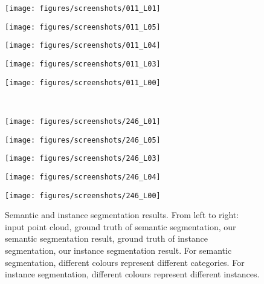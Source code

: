 \documentclass[10pt,twocolumn,letterpaper]{article}
\begin{document}
\begin{figure*}[t!]
  \begin{minipage}{0.2\linewidth}
    \texttt{[image: figures/screenshots/011\_L01]}
  \end{minipage}\begin{minipage}{0.2\linewidth}
    \texttt{[image: figures/screenshots/011\_L05]}
  \end{minipage}\begin{minipage}{0.2\linewidth}
    \texttt{[image: figures/screenshots/011\_L04]}
  \end{minipage}\begin{minipage}{0.2\linewidth}
    \texttt{[image: figures/screenshots/011\_L03]}
  \end{minipage}\begin{minipage}{0.2\linewidth}
    \texttt{[image: figures/screenshots/011\_L00]}
  \end{minipage}\\
  \begin{minipage}{0.2\linewidth}
    \texttt{[image: figures/screenshots/246\_L01]}
  \end{minipage}\begin{minipage}{0.2\linewidth}
    \texttt{[image: figures/screenshots/246\_L05]}
  \end{minipage}\begin{minipage}{0.2\linewidth}
    \texttt{[image: figures/screenshots/246\_L03]}
  \end{minipage}\begin{minipage}{0.2\linewidth}
    \texttt{[image: figures/screenshots/246\_L04]}
  \end{minipage}\begin{minipage}{0.2\linewidth}
    \texttt{[image: figures/screenshots/246\_L00]}
  \end{minipage}
  \vspace{0.1in}
  \caption{Semantic and instance segmentation results. From left to right: input
    point cloud, ground truth of semantic segmentation, our semantic
    segmentation result, ground truth of instance segmentation, our instance
    segmentation result. For semantic segmentation, different colours represent
    different categories. For instance segmentation, different colours represent
    different instances.}
  \label{fig:qualitative}
\end{figure*}
\end{document}
